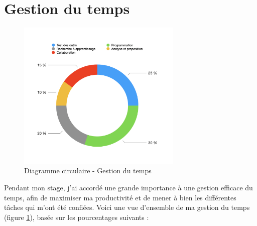 \section{Gestion du temps}

\begin{figure}[h] 
    \centering
    \includegraphics[width=0.7\textwidth]{Includes/Images/gestionTemps.png}
    \caption{Diagramme circulaire - Gestion du temps}
    \label{fig:Diagramme circulaire - Gestion du temps}
\end{figure}  

Pendant mon stage, j'ai accordé une grande importance à une gestion efficace du temps, afin de maximiser ma productivité et de mener à bien les différentes tâches qui m'ont été confiées. Voici une vue d'ensemble de ma gestion du temps (figure \ref{fig:Diagramme circulaire - Gestion du temps}), basée sur les pourcentages suivants :

